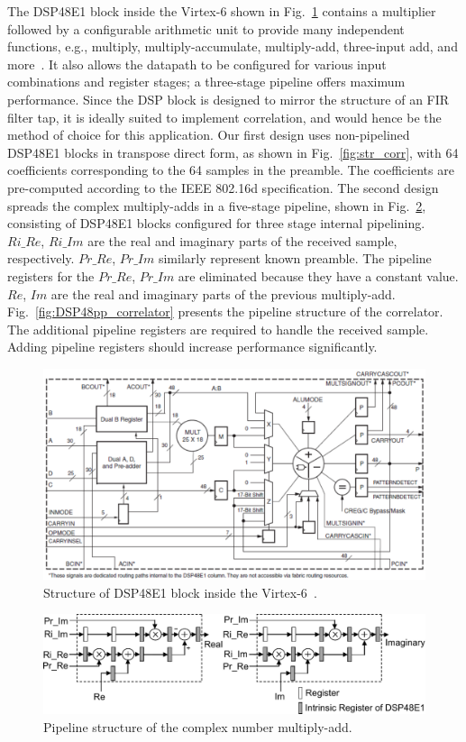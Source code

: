 The DSP48E1 block inside the Virtex-6 shown in Fig.~\ref{fig:DSP48E1} contains a multiplier followed by a configurable arithmetic unit to provide many independent functions, e.g., multiply, multiply-accumulate, multiply-add, three-input add, and more~\cite{Xilinx2011}.
It also allows the datapath to be configured for various input combinations and register stages; a three-stage pipeline offers maximum performance.
Since the DSP block is designed to mirror the structure of an FIR filter tap, it is ideally suited to implement correlation, and would hence be the method of choice for this application.
Our first design uses non-pipelined DSP48E1 blocks in transpose direct form, as shown in Fig.~\ref{fig:str_corr}, with 64 coefficients corresponding to the 64 samples in the preamble.
The coefficients are pre-computed according to the IEEE 802.16d specification.
The second design spreads the complex multiply-adds in a five-stage pipeline, shown in Fig.~\ref{fig:Cmp_MultAdder}, consisting of DSP48E1 blocks configured for three stage internal pipelining.
$Ri\_Re$, $Ri\_Im$ are the real and imaginary parts of the received sample, respectively.
$Pr\_Re$, $Pr\_Im$ similarly represent known preamble.
The pipeline registers for the $Pr\_Re$, $Pr\_Im$ are eliminated because they have a constant value.
$Re$, $Im$ are the real and imaginary parts of the previous multiply-add.
Fig.~\ref{fig:DSP48pp_correlator} presents the pipeline structure of the correlator.
The additional pipeline registers are required to handle the received sample.
Adding pipeline registers should increase performance significantly.
\begin{figure}
	\centerline{\includegraphics [width=0.9\columnwidth] {figures/DSP48E1.pdf} }
	\caption{Structure of DSP48E1 block inside the Virtex-6~\cite{Xilinx2011}.}
	\label{fig:DSP48E1}
\end{figure}

\begin{figure}
	\centerline{\includegraphics [width=0.9\columnwidth] {figures/Cmp_MultAdder.pdf} }
	\caption{Pipeline structure of the complex number multiply-add.}
	\label{fig:Cmp_MultAdder}
\end{figure}

